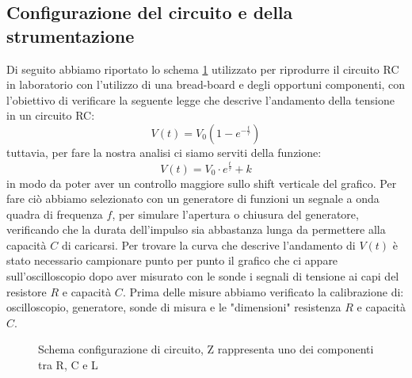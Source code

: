 \documentclass[letterpaper,12pt]{article}
\begin{document}
\subsection{Configurazione del circuito e della strumentazione}
Di seguito abbiamo riportato lo schema \ref{fig:config_circuito} utilizzato per riprodurre il circuito RC in laboratorio con l'utilizzo di una bread-board e degli opportuni componenti, con l'obiettivo di verificare la seguente legge che descrive l'andamento della tensione in un circuito RC:
\begin{equation}
\label{eq: Modello esponenziale}
    V(t) = V_0 \left(1  -e^{-\frac{t}{\tau}}\right) 
\end{equation}
tuttavia, per fare la nostra analisi ci siamo serviti della funzione:
\begin{equation}
    \label{eq: Modello esponenziale modificato}
    V(t) = V_0 \cdot e^{\frac{t}{\tau}} + k
\end{equation}
in modo da poter aver un controllo maggiore sullo shift verticale del grafico.
Per fare ciò abbiamo selezionato con un generatore di funzioni un segnale a onda quadra di frequenza $f$, per simulare l'apertura o chiusura del generatore, verificando che la durata dell'impulso sia abbastanza lunga da permettere alla capacità $C$ di caricarsi.
Per trovare la curva che descrive l'andamento di $V(t)$ è stato necessario campionare punto per punto il grafico che ci appare sull'oscilloscopio dopo aver  misurato con le sonde i segnali di tensione ai capi del resistore $R$ e capacità $C$. Prima delle misure abbiamo verificato la calibrazione di: oscilloscopio, generatore, sonde di misura e le "dimensioni" resistenza $R$ e capacità $C$.
\begin{figure}[h!]
    \centering
    \caption{Schema configurazione di circuito, Z rappresenta uno dei componenti tra R, C e L}
    \label{fig:config_circuito}
\end{figure}
\end{document}
